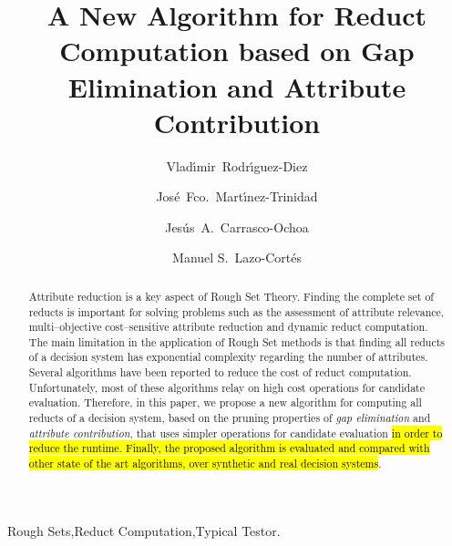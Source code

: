 \documentclass[number,preprint,review,12pt]{elsarticle}
\begin{document}
	\title{A New Algorithm for Reduct Computation based on Gap Elimination and Attribute Contribution}
	
	\author[inaoe,uc]{Vlad\'{\i}mir~Rodr\'{\i}guez-Diez}
	\author[inaoe]{Jos\'{e}~Fco.~Mart\'{\i}nez-Trinidad}
	\author[inaoe]{Jes\'{u}s~A.~Carrasco-Ochoa}	
	\author[inaoe]{Manuel S.~Lazo-Cort\'{e}s}
	\address[inaoe]{Computer Science Department\\
					Instituto Nacional de Astrof\'{\i}sica, \'{O}ptica y Electr\'{o}nica\\
					Luis Enrique Erro \# 1, Santa Mar\'{\i}a Tonantzintla, Puebla, 72840, M\'{e}xico} 
	\address[uc]{Electrical Engineering Department\\
				 Universidad de Camag\"{u}ey\\
				 Circv. Nte. km 5$\frac{1}{2}$, Camag\"{u}ey, Cuba}
	
	\begin{abstract}
		Attribute reduction is a key aspect of Rough Set Theory.  Finding the complete set of reducts is important for solving problems such as the assessment of attribute relevance, multi--objective cost--sensitive attribute reduction and dynamic reduct computation. The main limitation in the application of Rough Set methods is that finding all reducts of a decision system has exponential complexity regarding the number of attributes. Several algorithms have been reported to reduce the cost of reduct computation. Unfortunately, most of these algorithms relay on high cost operations for candidate evaluation. Therefore, in this paper, we propose a new algorithm for computing all reducts of a decision system, based on the pruning properties of \textit{gap  elimination} and \textit{attribute contribution}, that uses simpler operations for candidate evaluation \hl{in order to reduce the runtime. Finally, the proposed algorithm is evaluated and compared with other state of the art algorithms, over synthetic and real decision systems}.
	\end{abstract}
	
	\begin{keyword}
		Rough Sets\sep Reduct Computation\sep Typical Testor.
	\end{keyword}

	\maketitle

\end{document}
